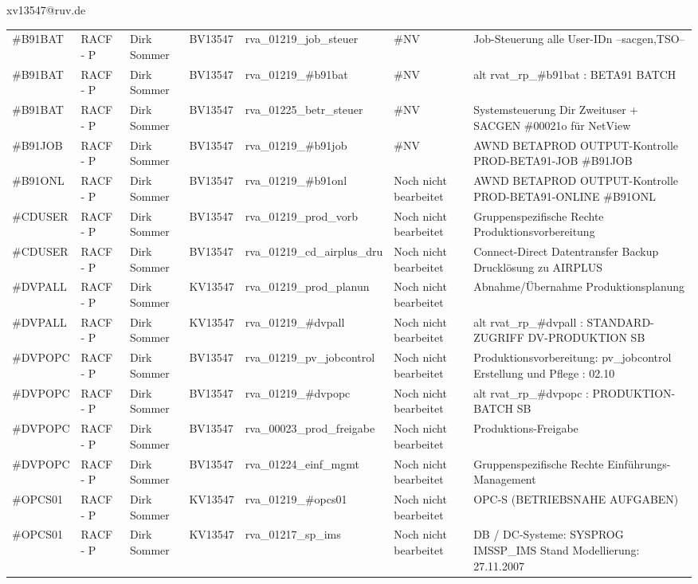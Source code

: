 \documentclass[a4paper,landscape,12pt]{letter}
\begin{document}
\begin{letter}{xv13547@ruv.de\hfill \break}
\begin{tiny}
\begin{longtable}{|p{35mm}|p{15mm}|p{25mm}|p{10mm}|p{40mm}|p{50mm}|p{50mm}|}
\#B91BAT & RACF - P & Dirk Sommer & BV13547 & rva\_01219\_job\_steuer & \#NV & Job-Steuerung alle User-IDn --sacgen,TSO-- \\
\#B91BAT & RACF - P & Dirk Sommer & BV13547 & rva\_01219\_\#b91bat & \#NV & alt rvat\_rp\_\#b91bat          : BETA91 BATCH \\
\#B91BAT & RACF - P & Dirk Sommer & BV13547 & rva\_01225\_betr\_steuer & \#NV & Systemsteuerung Dir Zweituser + SACGEN \#00021o für NetView \\
\#B91JOB & RACF - P & Dirk Sommer & BV13547 & rva\_01219\_\#b91job & \#NV & AWND BETAPROD OUTPUT-Kontrolle PROD-BETA91-JOB \#B91JOB \\
\#B91ONL & RACF - P & Dirk Sommer & BV13547 & rva\_01219\_\#b91onl & Noch nicht bearbeitet & AWND BETAPROD OUTPUT-Kontrolle PROD-BETA91-ONLINE \#B91ONL \\
\#CDUSER & RACF - P & Dirk Sommer & BV13547 & rva\_01219\_prod\_vorb & Noch nicht bearbeitet & Gruppenspezifische Rechte Produktionsvorbereitung \\
\#CDUSER & RACF - P & Dirk Sommer & BV13547 & rva\_01219\_cd\_airplus\_dru & Noch nicht bearbeitet & Connect-Direct Datentransfer Backup Drucklösung zu AIRPLUS \\
\#DVPALL & RACF - P & Dirk Sommer & KV13547 & rva\_01219\_prod\_planun & Noch nicht bearbeitet & Abnahme/Übernahme Produktionsplanung \\
\#DVPALL & RACF - P & Dirk Sommer & KV13547 & rva\_01219\_\#dvpall & Noch nicht bearbeitet & alt rvat\_rp\_\#dvpall          : STANDARD-ZUGRIFF DV-PRODUKTION SB \\
\#DVPOPC & RACF - P & Dirk Sommer & BV13547 & rva\_01219\_pv\_jobcontrol & Noch nicht bearbeitet & Produktionsvorbereitung: pv\_jobcontrol Erstellung und Pflege : 02.10 \\
\#DVPOPC & RACF - P & Dirk Sommer & BV13547 & rva\_01219\_\#dvpopc & Noch nicht bearbeitet & alt rvat\_rp\_\#dvpopc          : PRODUKTION-BATCH SB \\
\#DVPOPC & RACF - P & Dirk Sommer & BV13547 & rva\_00023\_prod\_freigabe & Noch nicht bearbeitet & Produktions-Freigabe \\
\#DVPOPC & RACF - P & Dirk Sommer & BV13547 & rva\_01224\_einf\_mgmt & Noch nicht bearbeitet & Gruppenspezifische Rechte Einführungs-Management \\
\#OPCS01 & RACF - P & Dirk Sommer & KV13547 & rva\_01219\_\#opcs01 & Noch nicht bearbeitet & OPC-S (BETRIEBSNAHE AUFGABEN) \\
\#OPCS01 & RACF - P & Dirk Sommer & KV13547 & rva\_01217\_sp\_ims & Noch nicht bearbeitet & DB / DC-Systeme:  SYSPROG IMSSP\_IMS Stand Modellierung: 27.11.2007 \\

\end{longtable}
\end{tiny}
\end{letter}
\end{document}
